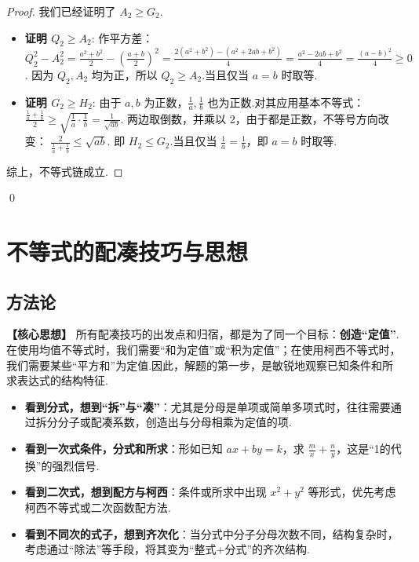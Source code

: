 			\begin{proof}
				我们已经证明了 $A_2 \ge G_2$.
				\begin{itemize}
					\item \textbf{证明 $Q_2 \ge A_2$}:
					作平方差：
					$Q_2^2 - A_2^2 = \frac{a^2+b^2}{2} - (\frac{a+b}{2})^2 = \frac{2(a^2+b^2) - (a^2+2ab+b^2)}{4} = \frac{a^2-2ab+b^2}{4} = \frac{(a-b)^2}{4} \ge 0$.
					因为 $Q_2, A_2$ 均为正，所以 $Q_2 \ge A_2$.当且仅当 $a=b$ 时取等.
					\item \textbf{证明 $G_2 \ge H_2$}:
					由于 $a,b$ 为正数，$\frac{1}{a}, \frac{1}{b}$ 也为正数.对其应用基本不等式：
					$\frac{\frac{1}{a}+\frac{1}{b}}{2} \ge \sqrt{\frac{1}{a} \cdot \frac{1}{b}} = \frac{1}{\sqrt{ab}}$.
					两边取倒数，并乘以 2，由于都是正数，不等号方向改变：
					$\frac{2}{\frac{1}{a}+\frac{1}{b}} \le \sqrt{ab}$.
					即 $H_2 \le G_2$.当且仅当 $\frac{1}{a}=\frac{1}{b}$，即 $a=b$ 时取等.
				\end{itemize}
				综上，不等式链成立.
			\end{proof}
			\qed

\section{不等式的配凑技巧与思想}

\subsection{方法论}

\textbf{【核心思想】}
\textcolor{green!50!black}{所有配凑技巧的出发点和归宿，都是为了同一个目标：\textbf{创造“定值”}.在使用均值不等式时，我们需要“和为定值”或“积为定值”；在使用柯西不等式时，我们需要某些“平方和”为定值.因此，解题的第一步，是敏锐地观察已知条件和所求表达式的结构特征.}
\begin{itemize}
	\item \textbf{看到分式，想到“拆”与“凑”}：尤其是分母是单项或简单多项式时，往往需要通过拆分分子或配凑系数，创造出与分母相乘为定值的项.
	\item \textbf{看到一次式条件，分式和所求}：形如已知 $ax+by=k$，求 $\frac{m}{x}+\frac{n}{y}$，这是“1的代换”的强烈信号.
	\item \textbf{看到二次式，想到配方与柯西}：条件或所求中出现 $x^2+y^2$ 等形式，优先考虑柯西不等式或二次函数配方法.
	\item \textbf{看到不同次的式子，想到齐次化}：当分式中分子分母次数不同，结构复杂时，考虑通过“除法”等手段，将其变为“整式+分式”的齐次结构.
\end{itemize}

